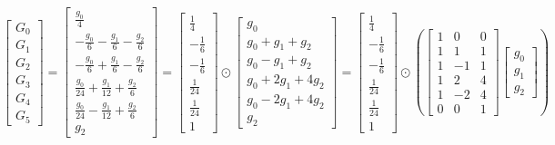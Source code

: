 \documentclass{article}%
\begin{document}
\[%
\left[\begin{matrix}G_{0}\\G_{1}\\G_{2}\\G_{3}\\G_{4}\\G_{5}\end{matrix}\right] = \left[\begin{matrix}\frac{g_{0}}{4}\\- \frac{g_{0}}{6} - \frac{g_{1}}{6} - \frac{g_{2}}{6}\\- \frac{g_{0}}{6} + \frac{g_{1}}{6} - \frac{g_{2}}{6}\\\frac{g_{0}}{24} + \frac{g_{1}}{12} + \frac{g_{2}}{6}\\\frac{g_{0}}{24} - \frac{g_{1}}{12} + \frac{g_{2}}{6}\\g_{2}\end{matrix}\right] = \left[\begin{matrix}\frac{1}{4}\\- \frac{1}{6}\\- \frac{1}{6}\\\frac{1}{24}\\\frac{1}{24}\\1\end{matrix}\right] \odot \left[\begin{matrix}g_{0}\\g_{0} + g_{1} + g_{2}\\g_{0} - g_{1} + g_{2}\\g_{0} + 2 g_{1} + 4 g_{2}\\g_{0} - 2 g_{1} + 4 g_{2}\\g_{2}\end{matrix}\right] = \left[\begin{matrix}\frac{1}{4}\\- \frac{1}{6}\\- \frac{1}{6}\\\frac{1}{24}\\\frac{1}{24}\\1\end{matrix}\right] \odot \left( \left[\begin{matrix}1 & 0 & 0\\1 & 1 & 1\\1 & -1 & 1\\1 & 2 & 4\\1 & -2 & 4\\0 & 0 & 1\end{matrix}\right] \left[\begin{matrix}g_{0}\\g_{1}\\g_{2}\end{matrix}\right] \right)%
\]%
\end{document}
